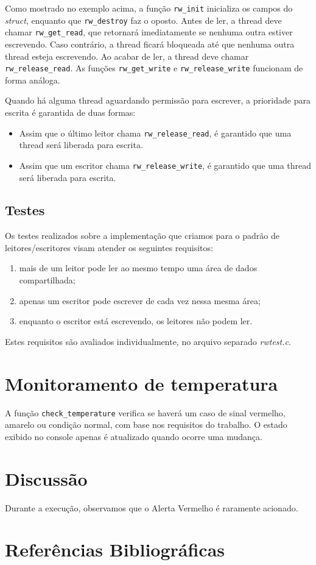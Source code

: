 \documentclass[12pt]{article}
\begin{document}
Como mostrado no exemplo acima,
a função \texttt{rw\_init}
inicializa os campos do \textit{struct},
enquanto que \texttt{rw\_destroy} faz o oposto.
Antes de ler,
a thread deve chamar \texttt{rw\_get\_read},
que retornará imediatamente
se nenhuma outra estiver escrevendo.
Caso contrário, a thread ficará bloqueada
até que nenhuma outra thread esteja escrevendo.
Ao acabar de ler,
a thread deve chamar \texttt{rw\_release\_read}.
As funções \texttt{rw\_get\_write} e \texttt{rw\_release\_write}
funcionam de forma análoga.

Quando há alguma thread aguardando permissão para escrever,
a prioridade para escrita é garantida de duas formas:
\begin{itemize}
	\item Assim que o último leitor chama \texttt{rw\_release\_read},
		é garantido que uma thread será liberada para escrita.
	\item Assim que um escritor chama \texttt{rw\_release\_write},
		é garantido que uma thread será liberada para escrita.
\end{itemize}

\subsection{Testes}

Os testes realizados sobre a implementação que criamos
para o padrão de leitores/escritores visam atender
os seguintes requisitos:
\begin{enumerate}
\item mais de um leitor pode ler ao mesmo tempo
uma área de dados compartilhada;
\item apenas um escritor pode escrever
de cada vez nessa mesma área;
\item enquanto o escritor está escrevendo,
os leitores não podem ler.
\end{enumerate}
Estes requisitos são avaliados individualmente,
no arquivo separado \textit{rwtest.c}.

\section{Monitoramento de temperatura}

A função \texttt{check\_temperature} verifica se haverá
um caso de sinal vermelho, amarelo ou condição normal,
com base nos requisitos do trabalho. O estado exibido
no console apenas é atualizado quando ocorre uma mudança.

\section{Discussão}

Durante a execução, observamos que o Alerta Vermelho
é raramente acionado.

\section{Referências Bibliográficas}
\end{document}
